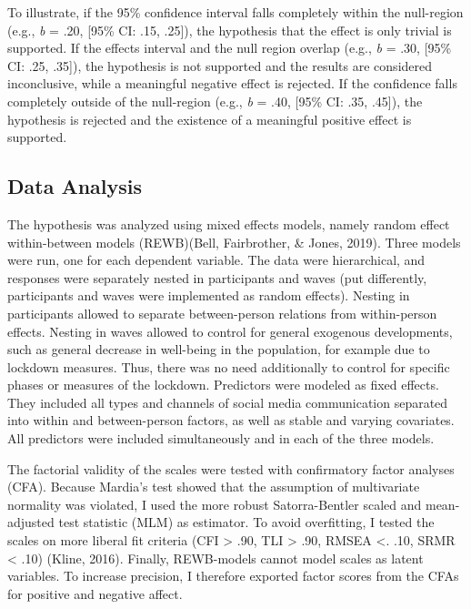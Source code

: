 \documentclass[
  english,
  man,mask,floatsintext]{apa6}
\begin{document}
To illustrate, if the 95\% confidence interval falls completely within the null-region (e.g., \emph{b} = .20, {[}95\% CI: .15, .25{]}), the hypothesis that the effect is only trivial is supported.
If the effects interval and the null region overlap (e.g., \emph{b} = .30, {[}95\% CI: .25, .35{]}), the hypothesis is not supported and the results are considered inconclusive, while a meaningful negative effect is rejected.
If the confidence falls completely outside of the null-region (e.g., \emph{b} = .40, {[}95\% CI: .35, .45{]}), the hypothesis is rejected and the existence of a meaningful positive effect is supported.

\hypertarget{data-analysis}{%
\subsection{Data Analysis}\label{data-analysis}}

The hypothesis was analyzed using mixed effects models, namely random effect within-between models (REWB)(Bell, Fairbrother, \& Jones, 2019).
Three models were run, one for each dependent variable.
The data were hierarchical, and responses were separately nested in participants and waves (put differently, participants and waves were implemented as random effects).
Nesting in participants allowed to separate between-person relations from within-person effects.
Nesting in waves allowed to control for general exogenous developments, such as general decrease in well-being in the population, for example due to lockdown measures.
Thus, there was no need additionally to control for specific phases or measures of the lockdown.
Predictors were modeled as fixed effects.
They included all types and channels of social media communication separated into within and between-person factors, as well as stable and varying covariates.
All predictors were included simultaneously and in each of the three models.

The factorial validity of the scales were tested with confirmatory factor analyses (CFA).
Because Mardia's test showed that the assumption of multivariate normality was violated, I used the more robust Satorra-Bentler scaled and mean-adjusted test statistic (MLM) as estimator.
To avoid overfitting, I tested the scales on more liberal fit criteria (CFI \textgreater{} .90, TLI \textgreater{} .90, RMSEA \textless. .10, SRMR \textless{} .10) (Kline, 2016).
Finally, REWB-models cannot model scales as latent variables.
To increase precision, I therefore exported factor scores from the CFAs for positive and negative affect.
\end{document}
